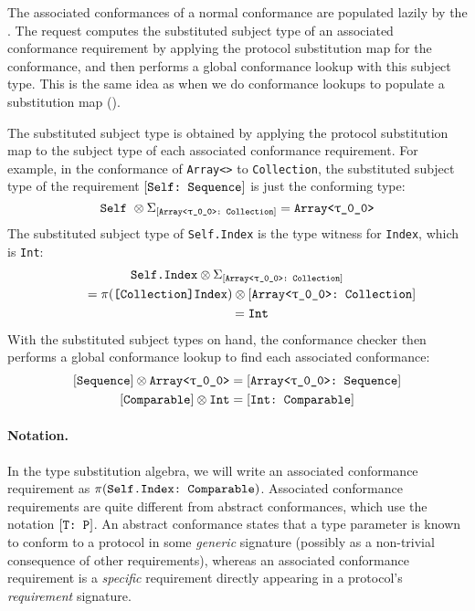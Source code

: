 \documentclass[../generics]{subfiles}
\begin{document}
The associated conformances of a normal conformance are populated lazily by the . The request computes the substituted subject type of an associated conformance requirement by applying the protocol substitution map for the conformance, and then performs a global conformance lookup with this subject type. This is the same idea as when we do conformance lookups to populate a substitution map ().

The substituted subject type is obtained by applying the protocol substitution map to the subject type of each associated conformance requirement. For example, in the conformance of \texttt{Array<>} to \texttt{Collection}, the substituted subject type of the requirement $[\texttt{Self:~Sequence}]$ is just the conforming type:
\[
\tSelf\ \otimes \Sigma_{\ConfReq{Array<\ttgp{0}{0}>}{Collection}} = \texttt{Array<\ttgp{0}{0}>}
\]
The substituted subject type of \verb|Self.Index| is the type witness for \verb|Index|, which is \verb|Int|:
\begin{gather*}
\texttt{Self.Index} \otimes \Sigma_{\ConfReq{Array<\ttgp{0}{0}>}{Collection}}\\
\qquad {} = \AssocType{[Collection]Index} \otimes \ConfReq{Array<\ttgp{0}{0}>}{Collection}\\
\qquad {} = \texttt{Int}
\end{gather*}
With the substituted subject types on hand, the conformance checker then performs a global conformance lookup to find each associated conformance:
\begin{gather*}
\protosym{Sequence} \otimes \texttt{Array<\ttgp{0}{0}>} = \ConfReq{Array<\ttgp{0}{0}>}{Sequence}\\
\protosym{Comparable} \otimes \texttt{Int} = \ConfReq{Int}{Comparable}
\end{gather*}
\paragraph{Notation.} In the type substitution algebra, we will write an associated conformance requirement as $\pi(\texttt{Self.Index:~Comparable})$. Associated conformance requirements are quite different from abstract conformances, which use the notation $[\texttt{T:~P}]$. An abstract conformance states that a type parameter is known to conform to a protocol in some \emph{generic} signature (possibly as a non-trivial consequence of other requirements), whereas an associated conformance requirement is a \emph{specific} requirement directly appearing in a protocol's \emph{requirement} signature.
\end{document}
